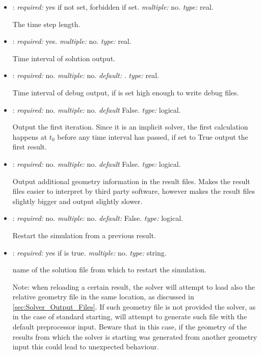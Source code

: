 \begin{itemize}
\item {}: \textit{required:} yes if  not set, forbidden if set. \textit{multiple:} no. \textit{type:} real.

The time step length.

\item {}: \textit{required:} yes. \textit{multiple:} no. \textit{type:} real.

Time interval of solution output.

\item {}: \textit{required:} no. \textit{multiple:} no. \textit{default:} . \textit{type:} real.

Time interval of debug output, if  is set high enough to write debug files.


\item {}: \textit{required:} no. \textit{multiple:} no. \textit{default} False. \textit{type:} logical.

Output the first iteration. Since it is an implicit solver, the first calculation happens at $t_0$ before any time interval has passed, if set to True output the first result.

\item {}: \textit{required:} no. \textit{multiple:} no. \textit{default} False. \textit{type:} logical.

Output additional geometry information in the result files. Makes the result files easier to interpret by third party software, however makes the result files slightly bigger and output slightly slower.

\item {}: \textit{required:} no. \textit{multiple:} no. \textit{default:} False. \textit{type:} logical.

Restart the simulation from a previous result.


\item {}: \textit{required:} yes if  is true. \textit{multiple:} no. \textit{type:} string.

name of the solution file from which to restart the simulation.

Note: when reloading a certain result, the solver will attempt to load also the relative geometry file in the same location, as discussed in \ref{sec:Solver_Output_Files}. If such geometry file is not provided the solver, as in the case of standard starting, will attempt to generate such file with the default preprocessor input. Beware that in this case, if the geometry of the results from which the solver is starting was generated from another geometry input this could lead to unexpected behaviour.



\end{itemize}
